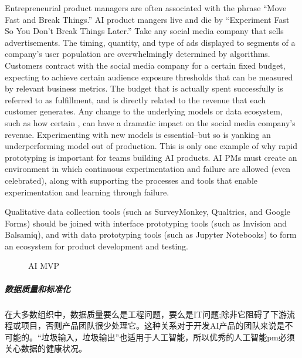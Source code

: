 \documentclass[letterpaper,11pt,english]{sphinxmanual}
\begin{document}
Entrepreneurial product managers are often associated with the phrase
“Move Fast and Break Things.” AI product mangers live and die by
“Experiment Fast So You Don’t Break Things Later.” Take any social media
company that sells advertisements. The timing, quantity, and type of ads
displayed to segments of a company’s user population are overwhelmingly
determined by algorithms. Customers contract with the social media
company for a certain fixed budget, expecting to achieve certain
audience exposure thresholds that can be measured by relevant business
metrics. The budget that is actually spent successfully is referred to
as fulfillment, and is directly related to the revenue that each
customer generates. Any change to the underlying models or data
ecosystem, such as how certain ,
can have a dramatic impact on the social media company’s revenue.
Experimenting with new models is essential–but so is yanking an
underperforming model out of production. This is only one example of why
rapid prototyping is important for teams building AI products. AI PMs
must create an environment in which continuous experimentation and
failure are allowed (even celebrated), along with supporting the
processes and tools that enable experimentation and learning through
failure.

Qualitative data collection tools (such as SurveyMonkey, Qualtrics, and
Google Forms) should be joined with interface prototyping tools (such as
Invision and Balsamiq), and with data prototyping tools (such as Jupyter
Notebooks) to form an ecosystem for product development and testing.

\begin{figure}[H]
\centering
\capstart

\noindent{}
\caption{AI MVP}\label{\detokenize{chapter_project/process:id37}}\end{figure}


\subparagraph{数据质量和标准化}
\label{\detokenize{chapter_project/process:id24}}
在大多数组织中，数据质量要么是工程问题，要么是IT问题;除非它阻碍了下游流程或项目，否则产品团队很少处理它。这种关系对于开发AI产品的团队来说是不可能的。“垃圾输入，垃圾输出”也适用于人工智能，所以优秀的人工智能pm必须关心数据的健康状况。
\end{document}
